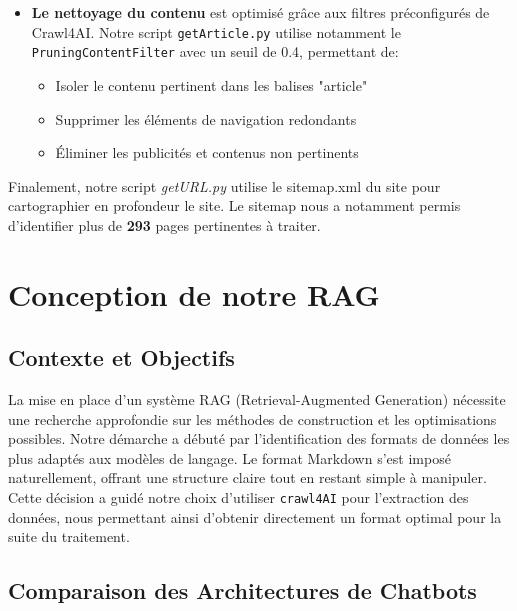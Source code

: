 \documentclass{article}
\begin{document}
\begin{enumerate}
\begin{itemize}
        \item \textbf{Le nettoyage du contenu} est optimisé grâce aux filtres préconfigurés de Crawl4AI. Notre script \texttt{getArticle.py} utilise notamment le \texttt{PruningContentFilter} avec un seuil de 0.4, permettant de:
        \begin{itemize}
            \item Isoler le contenu pertinent dans les balises "article"
            \item Supprimer les éléments de navigation redondants
            \item Éliminer les publicités et contenus non pertinents
        \end{itemize}
    \end{itemize}
\end{enumerate}

Finalement, notre script \textit{getURL.py} utilise le sitemap.xml du site pour cartographier en profondeur le site. Le sitemap nous a notamment permis d'identifier plus de \textbf{293} pages pertinentes à traiter.

\clearpage

\section{Conception de notre RAG}

\subsection{Contexte et Objectifs}
\quad La mise en place d'un système RAG (Retrieval-Augmented Generation) nécessite une recherche approfondie sur les méthodes de construction et les optimisations possibles. Notre démarche a débuté par l'identification des formats de données les plus adaptés aux modèles de langage. Le format Markdown s'est imposé naturellement, offrant une structure claire tout en restant simple à manipuler. Cette décision a guidé notre choix d'utiliser \texttt{crawl4AI} pour l'extraction des données, nous permettant ainsi d'obtenir directement un format optimal pour la suite du traitement.
    
\subsection{Comparaison des Architectures de Chatbots}
\end{document}
